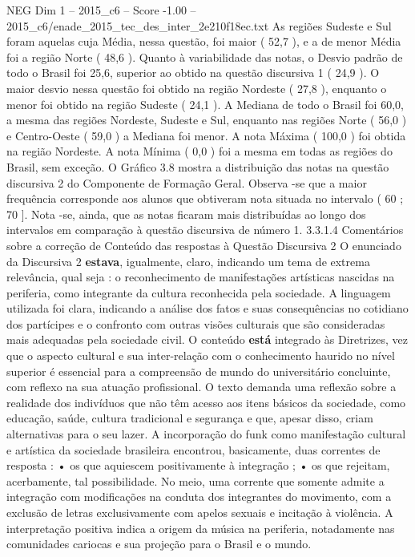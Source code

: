 \begin{textsample}{NEG Dim 1 – 2015\_c6 – Score -1.00 – 2015\_c6/enade\_2015\_tec\_des\_inter\_2e210f18ec.txt}
As regiões Sudeste e Sul foram aquelas cuja Média, nessa questão, foi maior ( 52,7 ), e a de menor Média foi a região Norte ( 48,6 ).
Quanto à variabilidade das notas, o Desvio padrão de todo o Brasil foi 25,6, superior ao obtido na questão discursiva 1 ( 24,9 ).
O maior desvio nessa questão foi obtido na região Nordeste ( 27,8 ), enquanto o menor foi obtido na região Sudeste ( 24,1 ).
A Mediana de todo o Brasil foi 60,0, a mesma das regiões Nordeste, Sudeste e Sul, enquanto nas regiões Norte ( 56,0 ) e Centro-Oeste ( 59,0 ) a Mediana foi menor.
A nota Máxima ( 100,0 ) foi obtida na região Nordeste.
A nota Mínima ( 0,0 ) foi a mesma em todas as regiões do Brasil, sem exceção.
O Gráfico 3.8 mostra a distribuição das notas na questão discursiva 2 do Componente de Formação Geral.
Observa -se que a maior frequência corresponde aos alunos que obtiveram nota situada no intervalo ( 60 ; 70 ].
Nota -se, ainda, que as notas ficaram mais distribuídas ao longo dos intervalos em comparação à questão discursiva de número 1. 3.3.1.4 Comentários sobre a correção de Conteúdo das respostas à Questão Discursiva 2 O enunciado da Discursiva 2 \textbf{estava}, igualmente, claro, indicando um tema de extrema relevância, qual seja : o reconhecimento de manifestações artísticas nascidas na periferia, como integrante da cultura reconhecida pela sociedade.
A linguagem utilizada foi clara, indicando a análise dos fatos e suas consequências no cotidiano dos partícipes e o confronto com outras visões culturais que são consideradas mais adequadas pela sociedade civil.
O conteúdo \textbf{está} integrado às Diretrizes, vez que o aspecto cultural e sua inter-relação com o conhecimento haurido no nível superior é essencial para a compreensão de mundo do universitário concluinte, com reflexo na sua atuação profissional.
O texto demanda uma reflexão sobre a realidade dos indivíduos que não têm acesso aos itens básicos da sociedade, como educação, saúde, cultura tradicional e segurança e que, apesar disso, criam alternativas para o seu lazer.
A incorporação do funk como manifestação cultural e artística da sociedade brasileira encontrou, basicamente, duas correntes de resposta : • os que aquiescem positivamente à integração ; • os que rejeitam, acerbamente, tal possibilidade.
No meio, uma corrente que somente admite a integração com modificações na conduta dos integrantes do movimento, com a exclusão de letras exclusivamente com apelos sexuais e incitação à violência.
A interpretação positiva indica a origem da música na periferia, notadamente nas comunidades cariocas e sua projeção para o Brasil e o mundo.

\end{textsample}
